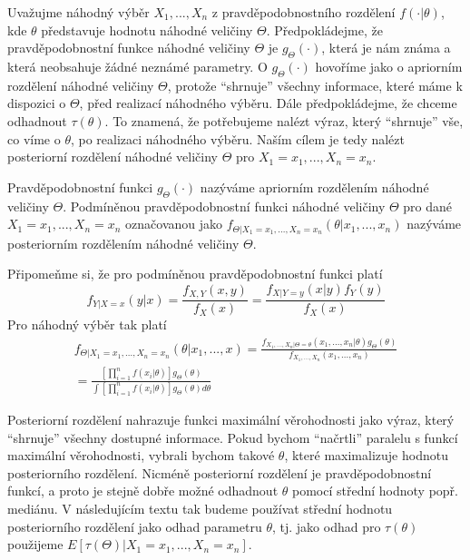 Uvažujme náhodný výběr $X_1, ..., X_n$ z pravděpodobnostního rozdělení $f(\cdot | \theta)$, kde $\theta$ představuje hodnotu náhodné veličiny $\Theta$. Předpokládejme, že pravděpodobnostní funkce náhodné veličiny $\Theta$ je $g_{\Theta}(\cdot)$, která je nám známa a která neobsahuje žádné neznámé parametry. O $g_{\Theta}(\cdot)$ hovoříme jako o apriorním rozdělení náhodné veličiny $\Theta$, protože ``shrnuje'' všechny informace, které máme k dispozici o $\Theta$, před realizací náhodného výběru. Dále předpokládejme, že chceme odhadnout $\tau(\theta)$. To znamená, že potřebujeme nalézt výraz, který ``shrnuje'' vše, co víme o $\theta$, po realizaci náhodného výběru. Naším cílem je tedy nalézt posteriorní rozdělení náhodné veličiny $\Theta$ pro $X_1 = x_1, ..., X_n = x_n$.

\begin{definition}
Pravděpodobnostní funkci $g_{\Theta}(\cdot)$ nazýváme apriorním rozdělením náhodné veličiny $\Theta$. Podmíněnou pravděpodobnostní funkci náhodné veličiny $\Theta$ pro dané $X_1 = x_1, ..., X_n = x_n$ označovanou jako $f_{\Theta|X_1 = x_1, ..., X_n = x_n}(\theta|x_1, ..., x_n)$ nazýváme posteriorním rozdělením náhodné veličiny $\Theta$.
\end{definition}

Připomeňme si, že pro podmíněnou pravděpodobnostní funkci platí
\begin{equation*}
f_{Y|X = x}(y|x) = \frac{f_{X,Y}(x,y)}{f_X(x)} = \frac{f_{X|Y = y}(x|y) f_Y(y)}{f_X(x)}
\end{equation*}
Pro náhodný výběr tak platí
\begin{gather*}
f_{\Theta|X_1 = x_1, ..., X_n = x_n}(\theta|x_1, ..., x) = \frac{f_{X_1, ..., X_n|\Theta = \theta}(x_1, ..., x_n|\theta)g_{\Theta}(\theta)}{f_{X_1, ..., X_n}(x_1, ..., x_n)}\\
= \frac{\left[\prod_{i = 1}^n f(x_i|\theta)\right]g_{\Theta}(\theta)}{\int \left[\prod_{i = 1}^n f(x_i|\theta)\right]g_{\Theta}(\theta)d\theta}
\end{gather*}

Posteriorní rozdělení nahrazuje funkci maximální věrohodnosti jako výraz, který ``shrnuje'' všechny dostupné informace. Pokud bychom ``načrtli'' paralelu s funkcí maximální věrohodnosti, vybrali bychom takové $\theta$, které maximalizuje hodnotu posteriorního rozdělení. Nicméně posteriorní rozdělení je pravděpodobnostní funkcí, a proto je stejně dobře možné odhadnout $\theta$ pomocí střední hodnoty popř. mediánu. V následujícím textu tak budeme používat střední hodnotu posteriorního rozdělení jako odhad parametru $\theta$, tj. jako odhad pro $\tau(\theta)$ použijeme $E[\tau(\Theta)|X_1 = x_1, ..., X_n = x_n]$.

